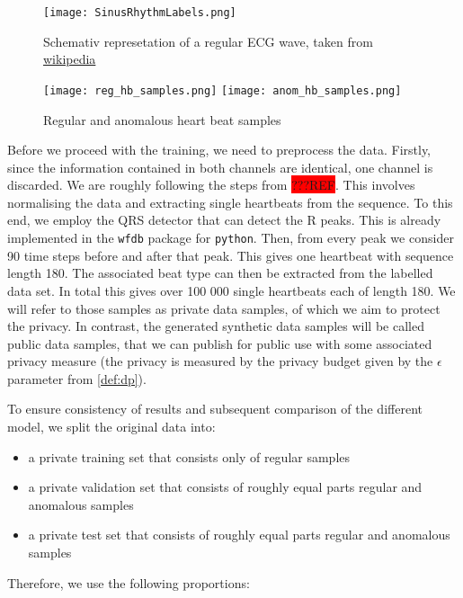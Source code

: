 \begin{figure}[h]
    \centering
    \texttt{[image: SinusRhythmLabels.png]}
    \caption{Schemativ represetation of a regular ECG wave, taken from \href{https://en.wikipedia.org/wiki/QRS_complex}{wikipedia}}
\end{figure}


\begin{figure}[h]
    \centering
    \texttt{[image: reg\_hb\_samples.png]}
    \texttt{[image: anom\_hb\_samples.png]}
    \caption{Regular and anomalous heart beat samples}
\end{figure}

Before we proceed with the training, we need to preprocess the data. Firstly, since the information contained in both channels are identical, one channel is discarded. We are roughly following the steps from \colorbox{red}{???REF}. This involves normalising the data and extracting single heartbeats from the sequence. To this end, we employ the QRS detector that can detect the R peaks. This is already implemented in the \texttt{wfdb} \parencite{wfdb} package for \texttt{python}. Then, from every peak we consider 90 time steps before and after that peak. This gives one heartbeat with sequence length 180. The associated beat type can then be extracted from the labelled data set. In total this gives over 100 000 single heartbeats each of length 180. We will refer to those samples as private data samples, of which we aim to protect the privacy. In contrast, the generated synthetic data samples will be called public data samples, that we can publish for public use with some associated privacy measure (the privacy is measured by the privacy budget given by the \(\epsilon\) parameter from \cref{def:dp}).

To ensure consistency of results and subsequent comparison of the different model, we split the original data into:
\begin{itemize}
    \item a private training set that consists only of regular samples
    \item a private validation set that consists of roughly equal parts regular and anomalous samples
    \item a private test set that consists of roughly equal parts regular and anomalous samples
\end{itemize}

Therefore, we use the following proportions:

